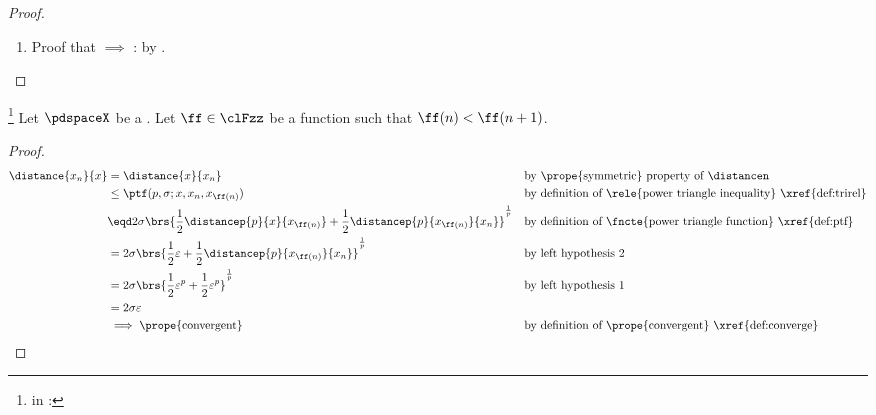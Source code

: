 \begin{proof}
\begin{enumerate}
  \item Proof that  $\implies$ : by .

\end{enumerate}
\end{proof}

\begin{theorem}
\footnote{
  in :
  }
Let $\pdspaceX$ be a .
Let $\ff\in\clFzz$ be a  function such that $\ff(n)<\ff(n+1)$.
\end{theorem}
\begin{proof}
\begin{align*}
  \distance{x_n}{x}
    &= \distance{x}{x_n}
    && \text{by \prope{symmetric} property of $\distancen$}
  \\&\le \ptf(p,\sigma;x,x_n,x_{\ff(n)})
    &&   \text{by definition of \rele{power triangle inequality} \xref{def:trirel}}
  \\&\eqd 2\sigma\brs{\frac{1}{2}\distancep{p}{x}{x_{\ff(n)}} + \frac{1}{2}\distancep{p}{x_{\ff(n)}}{x_n}}^\frac{1}{p}
    && \text{by definition of \fncte{power triangle function} \xref{def:ptf}}
  \\&=  2\sigma\brs{\frac{1}{2}\varepsilon  + \frac{1}{2}\distancep{p}{x_{\ff(n)}}{x_n}}^\frac{1}{p}
    && \text{by left hypothesis 2}
  \\&=  2\sigma\brs{\frac{1}{2}\varepsilon^p  + \frac{1}{2}\varepsilon^p}^\frac{1}{p}
    && \text{by left hypothesis 1}
  \\&= 2\sigma\varepsilon
  \\&\implies \text{\prope{convergent}}
    && \text{by definition of \prope{convergent} \xref{def:converge}}
\end{align*}
\end{proof}

